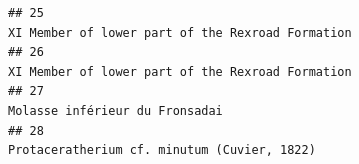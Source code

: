 \documentclass[]{article}
\begin{document}
\begin{verbatim}
## 25                                                                                                                                                                                                                                                                                                                                                                                                                                                                                                                                                                                                                                                 XI Member of lower part of the Rexroad Formation
## 26                                                                                                                                                                                                                                                                                                                                                                                                                                                                                                                                                                                                                                                 XI Member of lower part of the Rexroad Formation
## 27                                                                                                                                                                                                                                                                                                                                                                                                                                                                                                                                                                                                                                                                   Molasse inférieur du Fronsadai
## 28                                                                                                                                                                                                                                                                                                                                                                                                                                                                                                                                                                                                                                                      Protaceratherium cf. minutum (Cuvier, 1822)

\end{verbatim}
\end{document}
